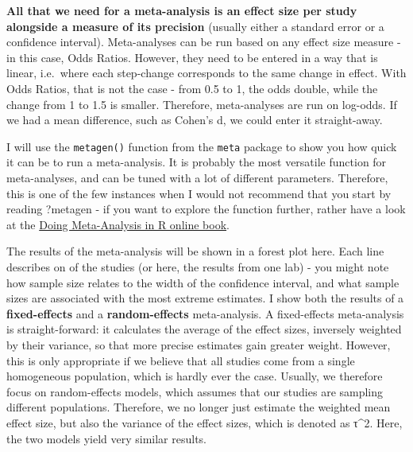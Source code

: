 \documentclass[
]{book}
\begin{document}
\textbf{All that we need for a meta-analysis is an effect size per study alongside a measure of its precision} (usually either a standard error or a confidence interval). Meta-analyses can be run based on any effect size measure - in this case, Odds Ratios. However, they need to be entered in a way that is linear, i.e.~where each step-change corresponds to the same change in effect. With Odds Ratios, that is not the case - from 0.5 to 1, the odds double, while the change from 1 to 1.5 is smaller. Therefore, meta-analyses are run on log-odds. If we had a mean difference, such as Cohen's d, we could enter it straight-away.

I will use the \texttt{metagen()} function from the \texttt{meta} package to show you how quick it can be to run a meta-analysis. It is probably the most versatile function for meta-analyses, and can be tuned with a lot of different parameters. Therefore, this is one of the few instances when I would not recommend that you start by reading ?metagen - if you want to explore the function further, rather have a look at the \href{https://bookdown.org/MathiasHarrer/Doing_Meta_Analysis_in_R}{Doing Meta-Analysis in R online book}.

The results of the meta-analysis will be shown in a forest plot here. Each line describes on of the studies (or here, the results from one lab) - you might note how sample size relates to the width of the confidence interval, and what sample sizes are associated with the most extreme estimates. I show both the results of a \textbf{fixed-effects} and a \textbf{random-effects} meta-analysis. A fixed-effects meta-analysis is straight-forward: it calculates the average of the effect sizes, inversely weighted by their variance, so that more precise estimates gain greater weight. However, this is only appropriate if we believe that all studies come from a single homogeneous population, which is hardly ever the case. Usually, we therefore focus on random-effects models, which assumes that our studies are sampling different populations. Therefore, we no longer just estimate the weighted mean effect size, but also the variance of the effect sizes, which is denoted as τ\^{}2. Here, the two models yield very similar results.
\end{document}
